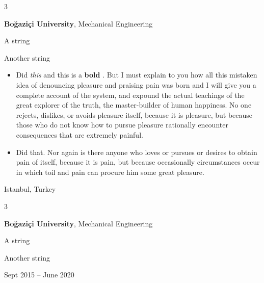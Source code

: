 \documentclass[10pt, letterpaper]{article}
\newenvironment{summary}{
    \begin{description}[
        topsep=0.10 cm,
        parsep=0.10 cm,
        partopsep=0pt,
        itemsep=0pt,
        leftmargin=0.4 cm + 10pt
    ]
}{
    \end{description}
} %
\newenvironment{highlights}{
    \begin{itemize}[
        topsep=0.10 cm,
        parsep=0.10 cm,
        partopsep=0pt,
        itemsep=0pt,
        leftmargin=0.4 cm + 10pt
    ]
}{
    \end{itemize}
} %
\newenvironment{threecolentry}[3][]{
    \onecolentry
    \def\thirdColumn{#3}
    \setcolumnwidth{1 cm, \fill, 4.5 cm}
    \begin{paracol}{3}
    {\raggedright #2} \switchcolumn
}{
    \switchcolumn \raggedleft \thirdColumn
    \end{paracol}
    \endonecolentry
} %
\let\hrefWithoutArrow\href
\renewcommand{\href}[2]{\hrefWithoutArrow{#1}{\ifthenelse{\equal{#2}{}}{ }{#2 }\raisebox{.15ex}{\footnotesize \faExternalLink*}}}
\begin{document}
        \begin{threecolentry}{\textbf{}}{
            Istanbul, Turkey
        }
            \textbf{Boğaziçi University}, Mechanical Engineering
            \begin{summary}
                \item A string
                \item Another string
            \end{summary}
            \begin{highlights}
                \item Did \textit{this} and this is a \textbf{bold} \href{https://example.com}{link}. But I must explain to you how all this mistaken idea of denouncing pleasure and praising pain was born and I will give you a complete account of the system, and expound the actual teachings of the great explorer of the truth, the master-builder of human happiness. No one rejects, dislikes, or avoids pleasure itself, because it is pleasure, but because those who do not know how to pursue pleasure rationally encounter consequences that are extremely painful.
                \item Did that. Nor again is there anyone who loves or pursues or desires to obtain pain of itself, because it is pain, but because occasionally circumstances occur in which toil and pain can procure him some great pleasure.
            \end{highlights}
        \end{threecolentry}

        \vspace{0.2 cm}

        \begin{threecolentry}{\textbf{}}{
            Sept 2015 – June 2020
        }
            \textbf{Boğaziçi University}, Mechanical Engineering
            \begin{summary}
                \item A string
                \item Another string
            \end{summary}
        \end{threecolentry}

        \vspace{0.2 cm}
\end{document}

